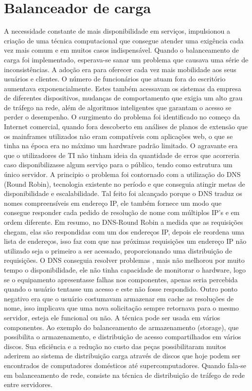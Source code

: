 \chapter{Balanceador de carga}

A necessidade constante de mais disponibilidade em serviços, impulsionou a criação de uma técnica computacional que consegue
atender uma exigência cada vez mais comum e em muitos casos indispensável. Quando o balanceamento de carga foi implementado,
esperava-se sanar um problema que causava uma série de inconsistências. A adoção era para oferecer cada vez mais mobilidade
aos seus usuários e clientes. O número de funcionários que atuam fora do escritório aumentava exponencialmente. Estes também
acessavam os sistemas da empresa de diferentes dispositivos, mudanças de comportamento que exigia um alto grau de tráfego na
rede, além de algoritmos inteligentes que garantam o acesso se perder o desempenho.
O surgimento do problema foi identificado no começo da Internet comercial, quando fora descoberto em análises de planos de
extensão que os mainframes utilizados não eram compatíveis com aplicações web, o que se tinha na época era no máximo um
hardware padrão limitado. O agravante era que o utilizadores de TI não tinham ideia da quantidade de erros que acorreria 
caso disponibilizasse algum serviço para o público, tendo como estrutura um único servidor.
A principio o problema foi contornado com a utilização do DNS (Round Robin), tecnologia existente no período e que conseguia
atingir metas de disponibilidade e escalabilidade. Tal feito foi alcançado porque o DNS traduz os nomes compreensíveis em
endereço IP, ele também fornece um modo que consegue responder cada pedido de resolução de nome com múltiplos IP’s e em 
ordem diferente. Em resumo, no DNS-Round Robin a medida que as requisições chegam, elas são respondidas com um dos endereços
IP, depois ele reordena uma lista de endereços, isso faz com que nas próximas requisições um endereço IP não utilizado 
seja o primeiro a ser acessado, proporcionando uma distribuição de requisições.
O DNS conseguia resolver problemas , mais não melhorou por muito tempo o disponibilidade, ele não tinha capacidade de
monitorar o hardware, logo se o equipamento apresentasse falhas nos componentes, apenas seria percebida quando o usuário
tentasse um acesso e este não fosse respondido. Outro  ponto negativo era que o usuário costumavam armazenar em cache as
resoluções de nome, isso implicava que uma nova solicitação sempre retornava para o mesmo servidor, esteja ele funcional 
ou não.
A técnica pode ser usada em vários componentes. Ao exemplo do balanceamento de armazenamento (storage), que possibilita o 
armazenamento, e distribuição de acesso compartilhados em vários discos. Sua eficiência e a redução no custo das 
peças possibilitaram muitos aderirem ao sistema de distribuição carga através de discos  que hoje podem ser 
encontrados de computadores domésticos até supercomputadores. Quando fala-se em balanceamento de rede, consiste 
na técnica de distribuição de tráfego de rede entre servidores.


